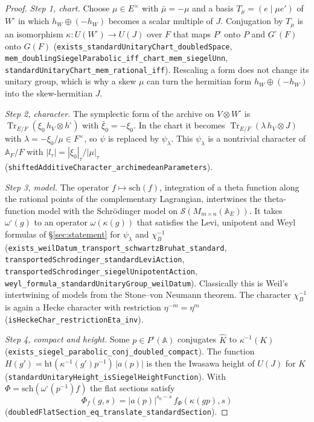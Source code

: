 \documentclass[11pt]{article}
\newcommand{\lean}[1]{\nolinkurl{#1}}
\theoremstyle{definition}
\begin{document}
\begin{proof}
\emph{Step 1, chart.} Choose $\mu\in E^\times$ with $\bar\mu=-\mu$ and a basis $T_\mu=(e\mid\mu e')$ of $W^\square$ in which $h_W\oplus(-h_W)$ becomes a scalar multiple of $J$. Conjugation by $T_\mu$ is an isomorphism $\kappa\colon U(W^\square)\to U(J)$ over $F$ that maps $P^\square$ onto $P$ and $G^\square(F)$ onto $G(F)$ (\lean{exists_standardUnitaryChart_doubledSpace}, \lean{mem_doublingSiegelParabolic_iff_chart_mem_siegelUnn}, \lean{standardUnitaryChart_mem_rational_iff}). Rescaling a form does not change its unitary group, which is why a skew $\mu$ can turn the hermitian form $h_W\oplus(-h_W)$ into the skew-hermitian $J$.

\emph{Step 2, character.} The symplectic form of the archive on $V\otimes W^\square$ is $\operatorname{Tr}_{E/F}(\xi_0\,h_V\otimes h^\square)$ with $\bar\xi_0=-\xi_0$. In the chart it becomes $\operatorname{Tr}_{E/F}(\lambda\,h_V\otimes J)$ with $\lambda=-\xi_0/\mu\in F^\times$, so $\psi$ is replaced by $\psi_\lambda$. This $\psi_\lambda$ is a nontrivial character of $\mathbb A_F/F$ with $|l_\tau|=|\xi_0|_\tau/|\mu|_\tau$ (\lean{shiftedAdditiveCharacter_archimedeanParameters}).

\emph{Step 3, model.} The operator $f\mapsto\mathrm{sch}(f)$, integration of a theta function along the rational points of the complementary Lagrangian, intertwines the theta-function model with the Schr\"odinger model on $\mathcal S(M_{m\times n}(\mathbb A_E))$. It takes $\omega^\square(g)$ to an operator $\omega(\kappa(g))$ that satisfies the Levi, unipotent and Weyl formulas of §\ref{sec:statement} for $\psi_\lambda$ and $\chi_B^{-1}$ (\lean{exists_weilDatum_transport_schwartzBruhat_standard}, \lean{transportedSchrodinger_standardLeviAction}, \lean{transportedSchrodinger_siegelUnipotentAction}, \lean{weyl_formula_standardUnitaryGroup_weilDatum}). Classically this is Weil's intertwining of models from the Stone--von Neumann theorem. The character $\chi_B^{-1}$ is again a Hecke character with restriction $\eta^{-m}=\eta^m$ (\lean{isHeckeChar_restrictionEta_inv}).

\emph{Step 4, compact and height.} Some $p\in P^\square(\mathbb A)$ conjugates $\widehat K$ to $\kappa^{-1}(K)$ (\lean{exists_siegel_parabolic_conj_doubled_compact}). The function $H(g')=\mathrm{ht}(\kappa^{-1}(g')p^{-1})\,|a(p)|$ is then the Iwasawa height of $U(J)$ for $K$ (\lean{standardUnitaryHeight_isSiegelHeightFunction}). With $\Phi=\mathrm{sch}(\omega^\square(p^{-1})f)$ the flat sections satisfy
\[
\Phi_f(g,s)=|a(p)|^{s_0-s}\,f_\Phi(\kappa(gp),s)
\]
(\lean{doubledFlatSection_eq_translate_standardSection}).


\end{proof}
\end{document}
